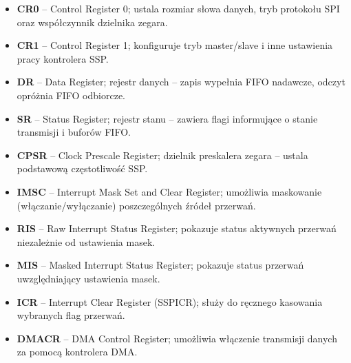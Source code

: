 \begin{itemize}
  \item \textbf{CR0} – Control Register 0; ustala rozmiar słowa danych, tryb protokołu SPI oraz współczynnik dzielnika zegara.
  \item \textbf{CR1} – Control Register 1; konfiguruje tryb master/slave i inne ustawienia pracy kontrolera SSP.
  \item \textbf{DR} – Data Register; rejestr danych – zapis wypełnia FIFO nadawcze, odczyt opróżnia FIFO odbiorcze.
  \item \textbf{SR} – Status Register; rejestr stanu – zawiera flagi informujące o stanie transmisji i buforów FIFO.
  \item \textbf{CPSR} – Clock Prescale Register; dzielnik preskalera zegara – ustala podstawową częstotliwość SSP.
  \item \textbf{IMSC} – Interrupt Mask Set and Clear Register; umożliwia maskowanie (włączanie/wyłączanie) poszczególnych źródeł przerwań.
  \item \textbf{RIS} – Raw Interrupt Status Register; pokazuje status aktywnych przerwań niezależnie od ustawienia masek.
  \item \textbf{MIS} – Masked Interrupt Status Register; pokazuje status przerwań uwzględniający ustawienia masek.
  \item \textbf{ICR} – Interrupt Clear Register (SSPICR); służy do ręcznego kasowania wybranych flag przerwań.
  \item \textbf{DMACR} – DMA Control Register; umożliwia włączenie transmisji danych za pomocą kontrolera DMA.
\end{itemize}
